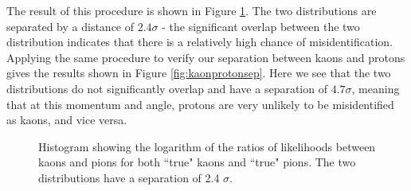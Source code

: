 The result of this procedure is shown in Figure \ref{fig:kaonpionsep}. The two distributions are separated by a distance of $2.4 \sigma$ - the significant overlap between the two distribution indicates that there is a relatively high chance of misidentification. Applying the same procedure to verify our separation between kaons and protons gives the results shown in Figure \ref{fig:kaonprotonsep}. Here we see that the two distributions do not significantly overlap and have a separation of $4.7 \sigma$, meaning that at this momentum and angle, protons are very unlikely to be misidentified as kaons, and vice versa.
\begin{figure}[]
\centering
{}
\caption[Particle identification separation for 7 GeV pions and kaons]{Histogram showing the logarithm of the ratios of likelihoods between kaons and pions for both ``true" kaons and ``true" pions. The two distributions have a separation of 2.4 $\sigma$.}
\label{fig:kaonpionsep} 
\end{figure}

